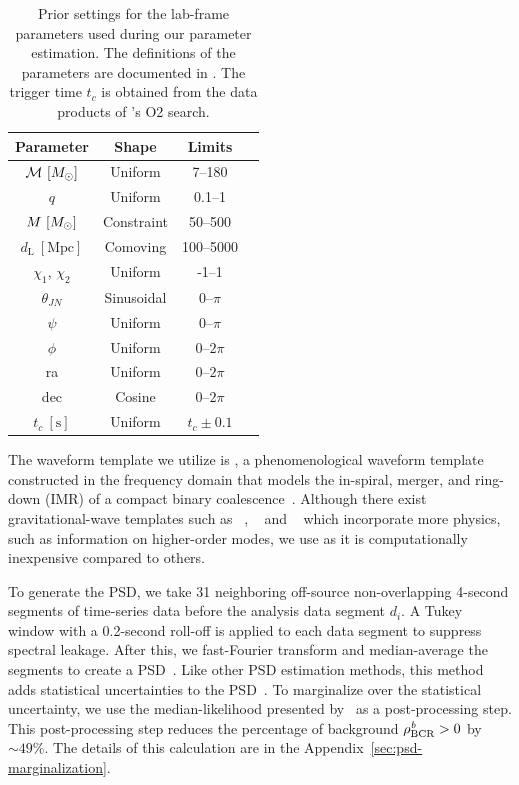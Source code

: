 \documentclass[useAMS,fleqn, usenatbib, final]{mnras}
\begin{document}
\begin{table}
    \centering
    \caption{
    Prior settings for the lab-frame parameters used during our parameter estimation. The definitions of the parameters are documented in \citet[Table~E1]{bilby_gwtc}. The trigger time $t_c$ is obtained from the data products of \pycbc's O2 search.  \label{tab:priors}} 
    \begin{tabular}{c c c c}
    \hline
    Parameter & Shape & Limits \\
    \hline
          $\mathcal{M}\ [\msun]$           & Uniform & 7--180  \\
          $q$                           & Uniform & 0.1--1  \\
          $M\ [\msun]$                     & Constraint & 50--500  \\
          $d_\mathrm{L}\ [\mathrm{Mpc}]$   & Comoving & 100--5000  \\
          $\chi_1$, $\chi_2$            & Uniform & -1--1  \\
          $\theta_{JN}$                 & Sinusoidal & 0--$\pi$  \\
          $\psi$                        & Uniform & 0--$\pi$  \\
          $\phi$                        & Uniform & 0--$2\pi$  \\
          ra                            & Uniform & 0--$2\pi$  \\
          dec                           & Cosine & 0--$2\pi$  \\
          $t_c\ [\mathrm{s}]$              & Uniform & $t_c\pm0.1$  \\
    \hline
    \end{tabular}
\end{table}


The waveform template we utilize is \imrphenomp, a phenomenological waveform template constructed in the frequency domain that models the in-spiral, merger, and ring-down (IMR) of a compact binary coalescence~\citep{khan2016frequency}. Although there exist gravitational-wave templates such as \imrxhm~\citep{imrphenompxhm}, \nrsur~\citep{nrsur7dq4} and \seob~\citep{seobnrv4phm} which incorporate more physics, such as information on higher-order modes, we use \imrphenomp as it is computationally inexpensive compared to others. 



To generate the PSD, we take 31 neighboring off-source non-overlapping  4-second  segments of time-series data before the analysis data segment $d_i$. A Tukey window with a 0.2-second roll-off is applied to each data segment to suppress spectral leakage. After this, we fast-Fourier transform and median-average the segments to create a PSD~\citep{ligo_psd}. Like other PSD estimation methods, this method adds statistical uncertainties to the PSD~\citep{psd_student_t, chatziioannou2019noise, Biscoveanu:2020:PhRvD}. To marginalize over the statistical uncertainty, we use the median-likelihood presented by~\citet{psd_student_t} as a post-processing step. 
This post-processing step reduces the percentage of background $\bgrdbcr>0$ by $\sim49\%$.
The details of this calculation are in the Appendix~\ref{sec:psd-marginalization}.
\end{document}
